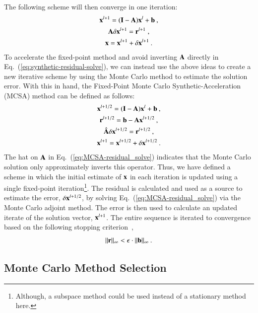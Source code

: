 \documentclass[preprint,12pt]{elsarticle}
\newcommand{\vA}{\ensuremath{\ve{A}}}
\newcommand{\vb}{\ensuremath{\ve{b}}}
\newcommand{\vx}{\ensuremath{\ve{x}}}
\newcommand{\vr}{\ensuremath{\ve{r}}}
\newcommand{\vI}{\ensuremath{\ve{I}}}
\begin{document}
The following scheme will then converge in one iteration:
\begin{subequations}
  \begin{gather}
    \vx^{l+1} = (\vI - \vA)\vx^l + \vb\:,\\ \vA \delta \vx^{l+1} =
    \vr^{l+1}\;,
    \label{eq:synthetic-residual-solve}\\ 
    \vx=\vx^{l+1}+\delta\vx^{l+1}\:.
  \end{gather}
\end{subequations}
To accelerate the fixed-point method and avoid inverting $\vA$
directly in Eq.~(\ref{eq:synthetic-residual-solve}), we can instead
use the above ideas to create a new iterative scheme by using the
Monte Carlo method to estimate the solution error. With this in hand,
the Fixed-Point Monte Carlo Synthetic-Acceleration (MCSA) method can
be defined as follows:
\begin{subequations}
  \label{eq:MCSA-iteration}
  \begin{gather}
    \vx^{l+1/2} = (\vI - \vA)\vx^l + \vb\:,\\  \vr^{l+1/2} = \vb -
    \vA\vx^{l+1/2}\:,
    \label{eq:MCSA-residual}\\     
     \hat{\vA}\delta\vx^{l+1/2} = \vr^{l+1/2}\:,
    \label{eq:MCSA-residual_solve}\\ 
     \vx^{l+1}=\vx^{l+1/2}+\delta\vx^{l+1/2}\:.
  \end{gather}
\end{subequations}
The hat on $\vA$ in Eq.~(\ref{eq:MCSA-residual_solve}) indicates that
the Monte Carlo solution only approximately inverts this operator.
Thus, we have defined a scheme in which the initial estimate of $\vx$
in each iteration is updated using a single fixed-point
iteration\footnote{Although, a subspace method could be used instead
  of a stationary method here.}.  The residual is calculated and used
as a source to estimate the error, $\delta\vx^{l+1/2}$, by solving
Eq.~(\ref{eq:MCSA-residual_solve}) via the Monte Carlo adjoint
method. The error is then used to calculate an updated iterate of the
solution vector, $\vx^{l+1}$.  The entire sequence is iterated to
convergence based on the following stopping
criterion~\cite{kelley_1995},
\begin{equation}
  \|\vr\|_{\infty} < \epsilon\cdot\|\vb\|_\infty\:.
  \label{eq:stopping-criteria}
\end{equation}

\subsection{Monte Carlo Method Selection}
\end{document}
